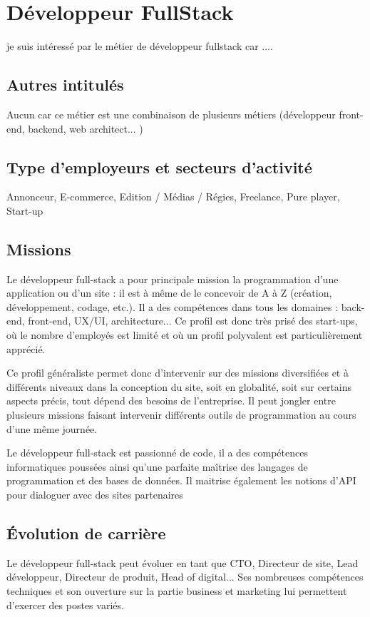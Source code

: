 \documentclass[a4paper, 12pt,french,oneside]{book}%
\theoremstyle{definition}
\theoremstyle{remark}
\begin{document}
\restoregeometry
\dominitoc%
\setcounter{tocdepth}{7}
\tableofcontents
\thispagestyle{empty}
\chapter{Développeur FullStack}
je suis intéressé par le métier de développeur fullstack car ....
\section{Autres intitulés}
Aucun car ce métier est une combinaison de plusieurs métiers (développeur front-end, backend, web architect... )
\section{Type d’employeurs et secteurs d’activité}
Annonceur, E-commerce, Edition / Médias / Régies, Freelance, Pure player, Start-up
\section{Missions}
Le développeur full-stack a pour principale mission la programmation d’une application ou
d’un site : il est à même de le concevoir de A à Z (création, développement, codage, etc.). Il a des compétences dans tous les domaines : back-end, front-end, UX/UI, architecture...
Ce profil est donc très prisé des start-ups, où le nombre d’employés est limité et où un profil polyvalent est particulièrement apprécié.

Ce profil généraliste permet donc d’intervenir sur des missions diversifiées et à différents niveaux dans la conception du site, soit en globalité, soit sur certains aspects précis, tout dépend des besoins de l’entreprise. Il peut jongler entre plusieurs missions faisant intervenir différents outils de programmation au cours d’une même journée.

Le développeur full-stack est passionné de code, il a des compétences informatiques poussées ainsi qu’une parfaite maîtrise des langages de programmation et des bases de données. Il maitrise également les notions d’API pour dialoguer avec des sites partenaires
\section{Évolution de carrière}
Le développeur full-stack peut évoluer en tant que CTO, Directeur de site, Lead développeur,
Directeur de produit, Head of digital... Ses nombreuses compétences techniques et son ouverture sur la partie business et marketing lui permettent d’exercer des postes variés.
\end{document}

